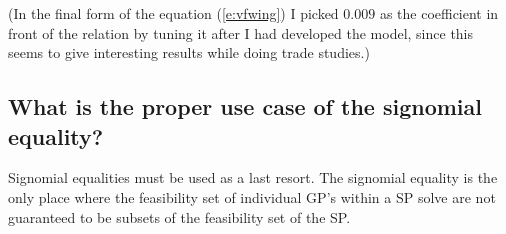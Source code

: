(In the final form of the equation (\ref{e:vfwing}) I picked $0.009$ as the coefficient in front of the relation by tuning it after I had developed
the model, since this seems to give interesting results while doing trade studies.)

\subsection{What is the proper use case of the signomial equality?} 

Signomial equalities must be used as a last resort. The signomial equality is the only place 
where the feasibility set of individual \gls{GP}'s within a \gls{SP} solve are not guaranteed 
to be subsets of the feasibility set of the \gls{SP}. 
